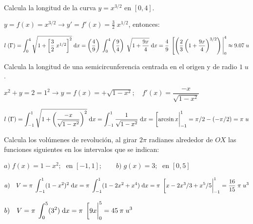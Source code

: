 \begin{ejre}
Calcula la longitud de la curva $y=x^{3/2}$ en $[0,4]$.	
\end{ejre}

\begin{proofw}\renewcommand{\qedsymbol}{$\diamond$}	

$y=f(x)=x^{3/2} \to y'=f'(x)=\frac 3 2 \; x^{1/2}$, entonces:

$l\;(\Gamma)=\displaystyle \int_0^4 \sqrt{1 + \left[ \frac 3 2 \; x^{1/2} \right]^2} \; \dd x =\left(\frac 4 9\right) \;  \int_0^4 \left(\frac 9 4\right)  \; \sqrt{1+ \frac {9x}{4}}\; \dd x= \frac 4 9 \; \eval[ \left(\frac 2 3  \left(1+ \frac {9x}{4} \right)^{3/2} \right)|_0^4 \approx 9.07\; u$ 
	
\end{proofw}

\begin{ejre}
Calcula la longitud de una semicircunferencia centrada en el origen y de radio $1\; u$.	
\end{ejre}

\begin{proofw}\renewcommand{\qedsymbol}{$\diamond$}	
$x^2+y=2=1^2 \to y=f(x)=+\sqrt{1-x^2}; \quad f'(x)=\dfrac {-x}{\sqrt{1-x^2}}	$

$l\; (\Gamma)=\displaystyle \int_{-1}^1 \sqrt{1+ \left(\dfrac {-x}{\sqrt{1-x^2}} \right)^2}\; \dd x = \int_{-1}^1 \dfrac {1}{\sqrt{1-x^2}}\; \dd x= \eval[\arcsin x|_{-1}^{1}=\pi/2-(-\pi/2)=\pi \; u$
\end{proofw}

\begin{ejre}
	Calcula los volúmenes de revolución, al girar $2\pi$ radianes alrededor de $OX$ las funciones siguientes en los intervalos que se indican:
	
$a)\; f(x)=1-x^2; \; \text{ en } [-1,1]; \qquad  b)\; g(x)=3; \; \text{ en } [0,5]$
\end{ejre}

\begin{proofw}\renewcommand{\qedsymbol}{$\diamond$}	

$a) \quad  V=\displaystyle \pi \; \int_{-1}^{1} (1-x^2)^2 \; \dd x = \pi \;  \int_{-1}^{1} (1-2x^2+x^4)\; \dd x = \pi\; \eval [x-2x^3/3+x^5/5|_{-1}^{1}= \frac {16}{15}\; \pi \; u^3$	



$b) \quad  V=\displaystyle \pi\; \int_{0}^{5} (3^2) \; \dd x= \pi\; \eval [9x|_{0}^{5}=45\:\pi\; u^3$	
\end{proofw}

